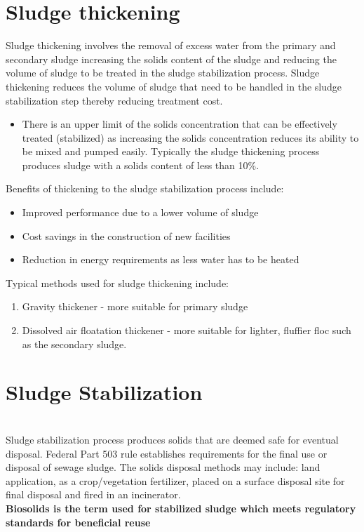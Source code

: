 \section{Sludge thickening}
Sludge thickening involves the removal of excess water from the primary and secondary sludge increasing the solids content of the sludge and reducing the volume of sludge to be treated in the sludge stabilization process.
Sludge thickening reduces the volume of sludge that need to be handled in the sludge stabilization step thereby reducing treatment cost.  
\begin{itemize}
\item There is an upper limit of the solids concentration that can be effectively treated (stabilized) as increasing the solids concentration reduces its ability to be mixed and pumped easily.  Typically the sludge thickening process produces sludge with a solids content of less than 10\%.\\
\end{itemize}
Benefits of thickening to the sludge stabilization process include:
\begin{itemize}
\item Improved performance due to a lower volume of sludge
\item Cost savings in the construction of new facilities
\item Reduction in energy requirements as less water has to be heated
\end{itemize}
Typical methods used for sludge thickening include:
\begin{enumerate}
\item Gravity thickener - more suitable for primary sludge
\item Dissolved air floatation thickener - more suitable for lighter, fluffier floc such as the secondary sludge.
\end{enumerate}
\section{Sludge Stabilization}
\textbf{}\\
Sludge stabilization process produces solids that are deemed safe for eventual disposal.  Federal Part 503 rule establishes requirements for the final use or disposal of sewage sludge.  The solids disposal methods may include: land application, as a crop/vegetation fertilizer, placed on a surface disposal site for final disposal and fired in an incinerator.\\
\textbf{Biosolids is the term used for stabilized sludge which meets regulatory standards for beneficial reuse}\\  

